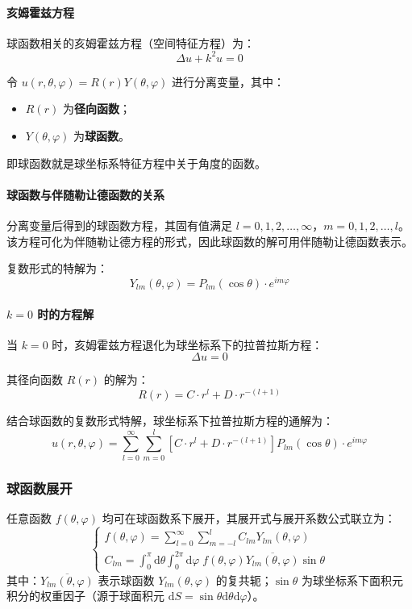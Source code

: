 \documentclass{article}
\begin{document}
	\paragraph{亥姆霍兹方程}
	球函数相关的亥姆霍兹方程（空间特征方程）为：
	\[
	\Delta u + k^2 u = 0
	\]
	
	令 $u(r,\theta,\varphi)=R(r)Y(\theta,\varphi)$ 进行分离变量，其中：
	\begin{itemize}[leftmargin=2em, itemsep=0.3em]
		\item $R(r)$ 为\textbf{径向函数}；
		\item $Y(\theta,\varphi)$ 为\textbf{球函数}。
	\end{itemize}
	
	即球函数就是球坐标系特征方程中关于角度的函数。
	
	\paragraph{球函数与伴随勒让德函数的关系}
	分离变量后得到的球函数方程，其固有值满足 $l=0,1,2,\dots,\infty$，$m=0,1,2,\dots,l$。
	该方程可化为伴随勒让德方程的形式，因此球函数的解可用伴随勒让德函数表示。
	
	复数形式的特解为：
	\[
	Y_{lm}(\theta,\varphi)=P_{lm}(\cos\theta)\cdot e^{im\varphi}
	\]
	
	\paragraph{$k=0$ 时的方程解}
	当 $k=0$ 时，亥姆霍兹方程退化为球坐标系下的拉普拉斯方程：
	\[
	\Delta u = 0
	\]
	
	其径向函数 $R(r)$ 的解为：
	\[
	R(r)=C\cdot r^l+D\cdot r^{-(l+1)}
	\]
	
	结合球函数的复数形式特解，球坐标系下拉普拉斯方程的通解为：
	\[
	u(r,\theta,\varphi)=\sum_{l=0}^{\infty}\sum_{m=0}^{l}\left[C\cdot r^l+D\cdot r^{-(l+1)}\right]P_{lm}(\cos\theta)\cdot e^{im\varphi}
	\]
	
	\subsubsection{球函数展开}
	
	任意函数 $f(\theta,\varphi)$ 均可在球函数系下展开，其展开式与展开系数公式联立为：
	\[
	\begin{cases}
		f(\theta,\varphi)=\displaystyle\sum_{l=0}^{\infty}\sum_{m=-l}^{l}C_{lm}Y_{lm}(\theta,\varphi) \\
		C_{lm}=\displaystyle\int_{0}^{\pi}\mathrm{d}\theta\int_{0}^{2\pi}\mathrm{d}\varphi\;f(\theta,\varphi)\overline{Y_{lm}(\theta,\varphi)}\sin\theta
	\end{cases}
	\]
	其中：$\overline{Y_{lm}(\theta,\varphi)}$ 表示球函数 $Y_{lm}(\theta,\varphi)$ 的复共轭；$\sin\theta$ 为球坐标系下面积元积分的权重因子（源于球面积元 $\mathrm{d}S = \sin\theta\mathrm{d}\theta\mathrm{d}\varphi$）。
	
\end{document}
